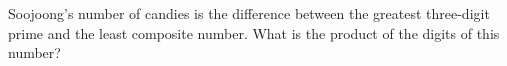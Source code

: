 Soojoong's number of candies is the difference between the greatest three-digit prime and the least composite number. What is the product of the digits of this number?
